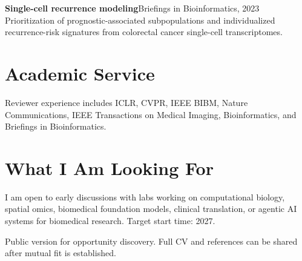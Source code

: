 \documentclass[10pt,a4paper]{article}
\newcommand{\venue}[1]{\textcolor{muted}{#1}}
\newcommand{\pubitem}[3]{%
  \textbf{#1}\hfill\venue{#3}\\
  #2\par\vspace{0.35em}
}
\begin{document}
\pubitem{Single-cell recurrence modeling}
{Prioritization of prognostic-associated subpopulations and individualized recurrence-risk signatures from colorectal cancer single-cell transcriptomes.}
{Briefings in Bioinformatics, 2023}

\section*{Academic Service}
Reviewer experience includes ICLR, CVPR, IEEE BIBM, Nature Communications, IEEE Transactions on Medical Imaging, Bioinformatics, and Briefings in Bioinformatics.

\section*{What I Am Looking For}
I am open to early discussions with labs working on computational biology, spatial omics, biomedical foundation models, clinical translation, or agentic AI systems for biomedical research. Target start time: 2027.

\vfill
{\small\textcolor{muted}{Public version for opportunity discovery. Full CV and references can be shared after mutual fit is established.}}
\end{document}
